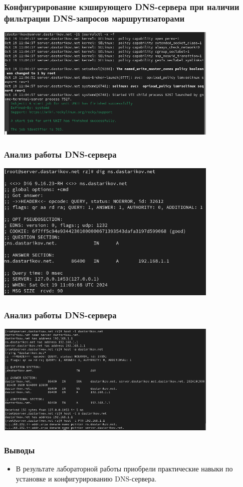 \begin{frame}
\frametitle{Конфигурирование кэширующего DNS-сервера при наличии фильтрации DNS-запросов маршрутизаторами}
    \centering
    \includegraphics[width=0.8\textwidth]{../images/image13.png}
\end{frame}


\begin{frame}
\frametitle{Анализ работы DNS-сервера}
    \centering
    \includegraphics[width=0.8\textwidth]{../images/image14.png}
\end{frame}

\begin{frame}
\frametitle{Анализ работы DNS-сервера}
    \centering
    \includegraphics[width=0.8\textwidth]{../images/image16.png}
\end{frame}



\begin{frame}
\frametitle{Выводы}
\begin{itemize}
    \item В результате лабораторной работы приобрели практические навыки по установке и конфигурированию DNS-сервера.
\end{itemize}
\end{frame}

